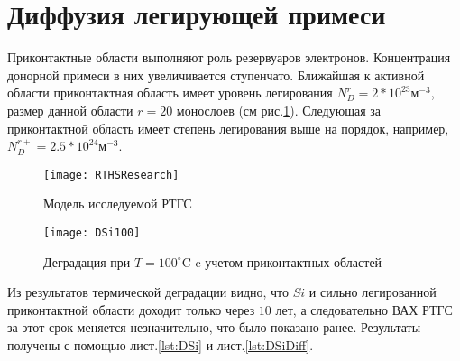 \section{Диффузия легирующей примеси}

Приконтактные области выполняют роль резервуаров электронов. Концентрация донорной примеси в них увеличивается ступенчато. Ближайшая к активной области приконтактная область имеет уровень легирования $N_{D}^{r} = 2*10^{23}$м$^{-3}$, размер данной области $r = 20$ монослоев (см рис.\ref{fig:RTHSResearch}). Следующая за приконтактной область имеет степень легирования выше на порядок, например, $N_{D}^{r+} = 2.5*10^{24}$м$^{-3}$.

\begin{figure}[h!]
	\centering
	\texttt{[image: RTHSResearch]}
	\caption{Модель исследуемой РТГС} 
	\label{fig:RTHSResearch}
\end{figure}

\begin{figure}[h!]
	\centering
	\texttt{[image: DSi100]}
	\caption{Деградация при $T = 100^{\circ}$C c учетом приконтактных областей}
	\label{fig:DSi100}
\end{figure}



Из результатов термической деградации видно, что $Si$ и сильно легированной приконтактной области доходит только через $10$ лет, а следовательно ВАХ РТГС за этот срок меняется незначительно, что было показано ранее. Результаты получены с помощью лист.\ref{lst:DSi} и лист.\ref{lst:DSiDiff}.